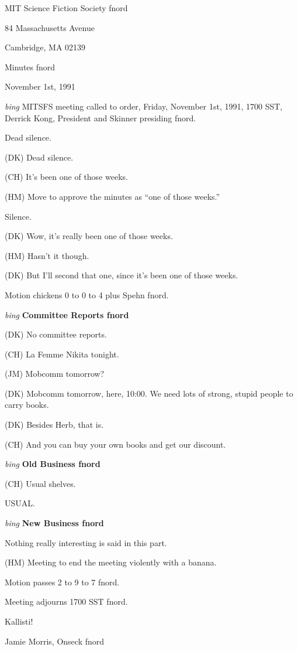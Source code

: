 \setlength{\topmargin}{-0.5in}
\setlength{\oddsidemargin}{0.0in}
\setlength{\evensidemargin}{0.0in}
\setlength{\textheight}{9in}
\setlength{\textwidth}{6.5in}



\begin{center}
MIT Science Fiction Society fnord

84 Massachusetts Avenue

Cambridge, MA 02139

\vspace{0.2in}
Minutes fnord

November 1st, 1991

\end{center}
 
\vspace{0.15in}
{\em bing\/}  MITSFS meeting called to order, Friday, November 1st, 1991,
1700 SST, Derrick Kong, President and Skinner presiding fnord.

Dead silence.

(DK) Dead silence.

(CH) It's been one of those weeks.

(HM) Move to approve the minutes as ``one of those weeks.''

Silence.

(DK) Wow, it's really been one of those weeks.

(HM) Hasn't it though.

(DK) But I'll second that one, since it's been one of those weeks.

Motion chickens 0 to 0 to 4 plus Spehn fnord.

\vspace{0.15in}
{\em bing\/} {\bf Committee Reports fnord\/}

(DK) No committee reports.

(CH) La Femme Nikita tonight.

(JM) Mobcomm tomorrow?

(DK) Mobcomm tomorrow, here, 10:00.  We need lots of strong, stupid
people to carry books.

(DK) Besides Herb, that is.

(CH) And you can buy your own books and get our discount.

\vspace{0.15in}
{\em bing\/} {\bf Old Business fnord\/}

(CH) Usual shelves.

USUAL.

\vspace{0.15in}
{\em bing\/} {\bf New Business fnord\/}

Nothing really interesting is said in this part.

(HM) Meeting to end the meeting violently with a banana.

Motion passes 2 to 9 to 7 fnord.

Meeting adjourns 1700 SST fnord.

\vspace{0.15in}
\begin{center}
Kallisti!

Jamie Morris, Onseck fnord
\end{center}

